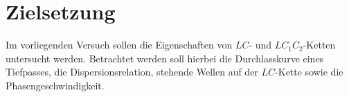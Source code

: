 \section{Zielsetzung}
\label{sec:Zielsetzung}
Im vorliegenden Versuch sollen die Eigenschaften von $LC$- und $LC_1C_2$-Ketten untersucht werden.
Betrachtet werden soll hierbei die Durchlasskurve eines Tiefpasses, die Dispersionsrelation,
stehende Wellen auf der $LC$-Kette sowie die Phasengeschwindigkeit.
